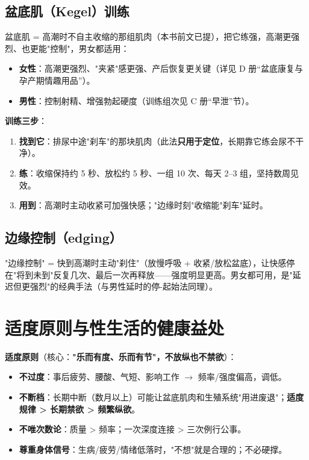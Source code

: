 \documentclass[12pt,UTF8,openany]{ctexbook}
\begin{document}
\subsection*{盆底肌（Kegel）训练}
盆底肌 = 高潮时不自主收缩的那组肌肉（本书前文已提），把它练强，高潮更强烈、也更能"控制"，男女都适用：
\begin{itemize}[leftmargin=2em,itemsep=0.2em]
  \item \textbf{女性}：高潮更强烈、"夹紧"感更强、产后恢复更关键（详见 D 册“盆底康复与孕产期情趣用品”）。
  \item \textbf{男性}：控制射精、增强勃起硬度（训练组次见 C 册“早泄”节）。
\end{itemize}
\textbf{训练三步}：
\begin{enumerate}[leftmargin=2em,itemsep=0.2em]
  \item \textbf{找到它}：排尿中途"刹车"的那块肌肉（此法\textbf{只用于定位}，长期靠它练会尿不干净）。
  \item \textbf{练}：收缩保持约 5 秒、放松约 5 秒、一组 10 次、每天 2--3 组，坚持数周见效。
  \item \textbf{用到}：高潮时主动收紧可加强快感；"边缘时刻"收缩能"刹车"延时。
\end{enumerate}

\subsection*{边缘控制（edging）}
"边缘控制" = 快到高潮时主动"刹住"（放慢呼吸 + 收紧/放松盆底），让快感停在"将到未到"反复几次、最后一次再释放——强度明显更高。男女都可用，是"延迟但更强烈"的经典手法（与男性延时的停-起始法同理）。

\section{适度原则与性生活的健康益处}

\textbf{适度原则}（核心：\textbf{"乐而有度、乐而有节"，不放纵也不禁欲}）：

\begin{itemize}[leftmargin=2em,itemsep=0.3em]
  \item \textbf{不过度}：事后疲劳、腰酸、气短、影响工作 $\to$ 频率/强度偏高，调低。
  \item \textbf{不断档}：长期中断（数月以上）可能让盆底肌肉和生殖系统"用进废退"；\textbf{适度规律 > 长期禁欲 > 频繁纵欲}。
  \item \textbf{不唯次数论}：质量 > 频率；一次深度连接 > 三次例行公事。
  \item \textbf{尊重身体信号}：生病/疲劳/情绪低落时，"不想"就是合理的；不必硬撑。
\end{itemize}
\end{document}
